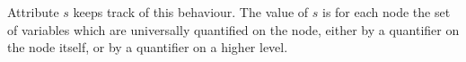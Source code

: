 %
% 
%
Attribute $s$ keeps track of this behaviour. 
%
The value of $s$ is for each node  the set of variables which are universally quantified on the node, 
either by a quantifier on the node itself, or by a quantifier on a higher level.
%
